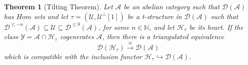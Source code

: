 \documentclass{proc-l}
\newtheorem{theorem}{Theorem}[section]
\theoremstyle{definition}
\theoremstyle{remark}
\numberwithin{equation}{section}
\begin{document}
\begin{theorem}[Tilting Theorem] \label{teor.tilting derived equivalence}
Let $\mathcal{A}$ be an abelian category such that $\mathcal{D}(\mathcal{A})$ has $Hom$ sets and let $\tau =(\mathcal{U},\mathcal{U}^\perp [1])$  be a t-structure in $\mathcal{D}(\mathcal{A})$ such that $\mathcal{D}^{\leq -n}(\mathcal{A})\subseteq\mathcal{U}\subseteq\mathcal{D}^{\leq 0}(\mathcal{A})$, for some $n\in\mathbb{N}$,  and let $\mathcal{H}_\tau$ be its heart. If  the class $\mathcal{Y}=\mathcal{A}\cap\mathcal{H}_\tau$ cogenerates $\mathcal{A}$, then there is a triangulated equivalence 
\[
\mathcal{D}(\mathcal{H}_\tau)\stackrel{\cong}{\longrightarrow}\mathcal{D}(\mathcal{A})
\]
which is compatible with the inclusion functor $\mathcal{H}_\tau\hookrightarrow\mathcal{D}(\mathcal{A})$.
\end{theorem}
\end{document}
